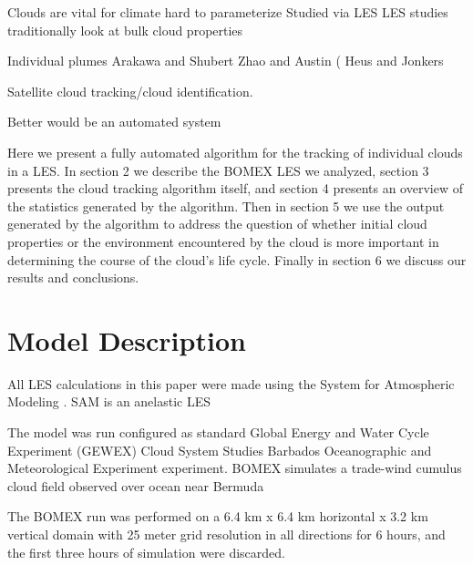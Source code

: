 \documentclass[acp]{copernicus}
\begin{document}



\introduction

Clouds are vital for climate
hard to parameterize
Studied via LES
LES studies traditionally look at bulk cloud properties

Individual plumes
Arakawa and Shubert
Zhao and Austin (
Heus and Jonkers

Satellite cloud tracking/cloud identification.

Better would be an automated system




Here we present a fully automated algorithm for the tracking of individual 
clouds in a LES.  In section 2 we describe the BOMEX LES we analyzed, section 3 
presents the cloud tracking algorithm itself, and section 4 presents an overview 
of the statistics generated by the algorithm.  Then in section 5 we use the 
output generated by the algorithm to address the question of whether initial 
cloud properties or the environment encountered by the cloud is more important 
in determining the course of the cloud's life cycle.  Finally in section 6 
we discuss our results and conclusions.


\section{Model Description}

All LES calculations in this paper were made using the System for Atmospheric 
Modeling \citep[SAM;][]{Khairoutdinov2003}.  SAM is an anelastic LES 

The model was run configured as standard Global Energy and Water
Cycle Experiment (GEWEX) Cloud System Studies \citep[GCSS;][]{Randall2003}
Barbados Oceanographic and Meteorological Experiment 
\citep[BOMEX;][]{Siebesma2003} experiment.  BOMEX simulates a trade-wind cumulus 
cloud field observed over ocean near Bermuda

The BOMEX run was performed on a 6.4 km x 6.4 km horizontal x 3.2 km vertical 
domain with 25 meter grid resolution in all directions for 6 hours, and the 
first three hours of simulation were discarded. 

\end{document}
